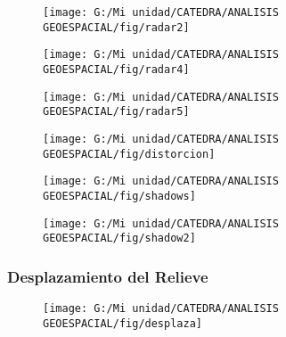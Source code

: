 \documentclass[14pt]{beamer}
\begin{document}
\begin{frame}
 \begin{figure}
    \centering
    \texttt{[image: G:/Mi unidad/CATEDRA/ANALISIS GEOESPACIAL/fig/radar2]}
  \end{figure}
\end{frame}
\begin{frame}
 \begin{figure}
    \centering
    \texttt{[image: G:/Mi unidad/CATEDRA/ANALISIS GEOESPACIAL/fig/radar4]}
  \end{figure}
\end{frame}
\begin{frame}
 \begin{figure}
    \centering
    \texttt{[image: G:/Mi unidad/CATEDRA/ANALISIS GEOESPACIAL/fig/radar5]}
  \end{figure}
\end{frame}
\begin{frame}
 \begin{figure}
    \centering
    \texttt{[image: G:/Mi unidad/CATEDRA/ANALISIS GEOESPACIAL/fig/distorcion]}
  \end{figure}
\end{frame}
\begin{frame}
 \begin{figure}
    \centering
    \texttt{[image: G:/Mi unidad/CATEDRA/ANALISIS GEOESPACIAL/fig/shadows]}
  \end{figure}
\end{frame}
\begin{frame}
 \begin{figure}
    \centering
    \texttt{[image: G:/Mi unidad/CATEDRA/ANALISIS GEOESPACIAL/fig/shadow2]}
  \end{figure}
\end{frame}
\begin{frame}
\frametitle{Desplazamiento del Relieve}
 \begin{figure}
    \centering
    \texttt{[image: G:/Mi unidad/CATEDRA/ANALISIS GEOESPACIAL/fig/desplaza]}
  \end{figure}
\end{frame}
\end{document}

